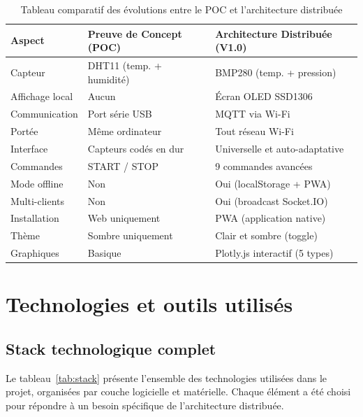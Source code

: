\documentclass[12pt, a4paper]{report}
\begin{document}
\begin{table}[H]
\centering
\renewcommand{\arraystretch}{1.5}
\begin{tabularx}{\linewidth}{|X|X|X|}
\hline
\rowcolor{bleuFonce!10}
\textbf{Aspect} &
\textbf{Preuve de Concept (POC)} &
\textbf{Architecture Distribu\'ee (V1.0)} \\
\hline
Capteur        & DHT11 (temp. + humidit\'e) & BMP280 (temp. + pression) \\
\hline
Affichage local & Aucun & \'Ecran OLED SSD1306 \\
\hline
Communication  & Port s\'erie USB & MQTT via Wi-Fi \\
\hline
Port\'ee       & M\^eme ordinateur & Tout r\'eseau Wi-Fi \\
\hline
Interface      & Capteurs cod\'es en dur & Universelle et auto-adaptative \\
\hline
Commandes      & START / STOP & 9 commandes avanc\'ees \\
\hline
Mode offline   & Non & Oui (localStorage + PWA) \\
\hline
Multi-clients  & Non & Oui (broadcast Socket.IO) \\
\hline
Installation   & Web uniquement & PWA (application native) \\
\hline
Th\`eme        & Sombre uniquement & Clair et sombre (toggle) \\
\hline
Graphiques     & Basique & Plotly.js interactif (5 types) \\
\hline
\end{tabularx}
\caption{Tableau comparatif des \'evolutions entre le POC et
         l'architecture distribu\'ee}
\label{tab:comparaison}
\end{table}

\chapter{Technologies et outils utilis\'es}

\section{Stack technologique complet}

Le tableau~\ref{tab:stack} pr\'esente l'ensemble des technologies
utilis\'ees dans le projet, organis\'ees par couche logicielle et
mat\'erielle. Chaque \'el\'ement a \'et\'e choisi pour r\'epondre
\`a un besoin sp\'ecifique de l'architecture distribu\'ee.
\end{document}
